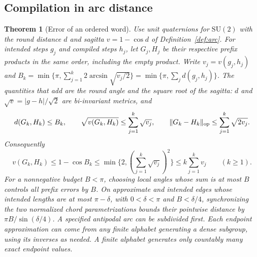 \documentclass[11pt,reqno]{amsart}
\newtheorem{theorem}{Theorem}[section]
\theoremstyle{definition}
\theoremstyle{remark}
\numberwithin{equation}{section}
\begin{document}
\subsection{Compilation in arc distance}

\begin{theorem}[Error of an ordered word]\label{m11:compile}
Use unit quaternions for $\mathrm{SU}(2)$ with the round distance $d$ and
sagitta $v=1-\cos d$ of Definition~\ref{def:arc}.
For intended steps $g_j$ and compiled steps $h_j$, let $G_j,H_j$
be their respective prefix products in the same order, including
the empty product. Write $v_j=v(g_j,h_j)$ and
$B_k=\min\{\pi,\sum_{j=1}^k 2\arcsin\sqrt{v_j/2}\}=\min\{\pi,\sum_j d(g_j,h_j)\}$.
The quantities that add are the round angle and the square root of the
sagitta: $d$ and $\sqrt v=|g-h|/\sqrt2$ are bi-invariant metrics, and
\[
 d(G_k,H_k)\le B_k,\qquad
 \sqrt{v(G_k,H_k)}\le\sum_{j=1}^k\sqrt{v_j},\qquad
 \|G_k-H_k\|_{\rm op}\le\sum_{j=1}^k\sqrt{2v_j}.
\]
Consequently
\[
 v(G_k,H_k)\le1-\cos B_k
 \le \min\{2,(\textstyle\sum_{j=1}^k\sqrt{v_j})^2\}
 \le k\sum_{j=1}^k v_j\qquad(k\ge1).
\]
For a nonnegative budget $B<\pi$, choosing local angles whose sum
is at most $B$ controls all prefix errors by $B$. On approximate and
intended edges whose intended lengths are at most $\pi-\delta$, with
$0<\delta<\pi$ and $B<\delta/4$, synchronizing the two normalized
chord parametrizations bounds their pointwise distance by
$\pi B/\sin(\delta/4)$. A specified antipodal arc can be subdivided
first. Each endpoint approximation can come from any finite
alphabet generating a dense subgroup, using its inverses as
needed. A finite alphabet generates only countably many exact
endpoint values.
\end{theorem}
\end{document}
